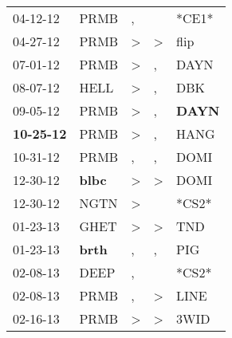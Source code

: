 \begin{supertabular}{p{0.07\textwidth}p{0.06\textwidth}p{0.02\textwidth}p{0.02\textwidth}p{0.06\textwidth}}
          04-12-12\textsuperscript{} &           PRMB\textsuperscript{} &                , &                  &                            *CE1* \\
          04-27-12\textsuperscript{} &           PRMB\textsuperscript{} &     \textgreater &     \textgreater &           flip\textsuperscript{} \\
          07-01-12\textsuperscript{} &           PRMB\textsuperscript{} &     \textgreater &                , &           DAYN\textsuperscript{} \\
          08-07-12\textsuperscript{} &           HELL\textsuperscript{} &     \textgreater &                , &            DBK\textsuperscript{} \\
          09-05-12\textsuperscript{} &           PRMB\textsuperscript{} &     \textgreater &                , &  \textbf{DAYN\textsuperscript{}} \\
 \textbf{10-25-12\textsuperscript{}} &           PRMB\textsuperscript{} &     \textgreater &                , &           HANG\textsuperscript{} \\
          10-31-12\textsuperscript{} &           PRMB\textsuperscript{} &                , &                , &           DOMI\textsuperscript{} \\
          12-30-12\textsuperscript{} &  \textbf{blbc\textsuperscript{}} &     \textgreater &     \textgreater &           DOMI\textsuperscript{} \\
          12-30-12\textsuperscript{} &           NGTN\textsuperscript{} &     \textgreater &                  &                            *CS2* \\
          01-23-13\textsuperscript{} &           GHET\textsuperscript{} &     \textgreater &     \textgreater &            TND\textsuperscript{} \\
          01-23-13\textsuperscript{} &  \textbf{brth\textsuperscript{}} &                , &                , &            PIG\textsuperscript{} \\
          02-08-13\textsuperscript{} &           DEEP\textsuperscript{} &                , &                  &                            *CS2* \\
          02-08-13\textsuperscript{} &           PRMB\textsuperscript{} &                , &     \textgreater &           LINE\textsuperscript{} \\
          02-16-13\textsuperscript{} &           PRMB\textsuperscript{} &     \textgreater &     \textgreater &           3WID\textsuperscript{} \\

\end{supertabular}
